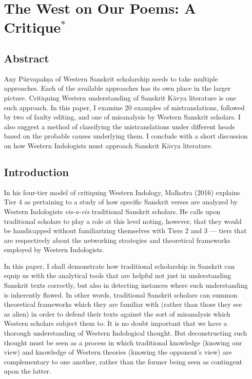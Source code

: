 \chapter[The West on Our Poems: A Critique]{The West on Our Poems: A Critique$^{*}$}\label{chapter\thechapter:begin}


\section*{Abstract} 

Any Pūrvapakṣa of Western Sanskrit scholarship needs to take multiple approaches. Each of the available approaches has its own place in the larger picture. Critiquing Western understanding of Sanskrit Kāvya literature is one such approach. In this paper, I examine 20 examples of mistranslations, followed by two of faulty editing, and one of misanalysis by Western Sanskrit scholars. I also suggest a method of classifying the mistranslations under different heads based on the probable causes underlying them. I conclude with a short discussion on how Western Indologists must approach Sanskrit Kāvya literature. 

\section*{Introduction}  

In his four-tier model of critiquing Western Indology, Malhotra (2016) explains Tier 4 as pertaining to a study of how specific Sanskrit verses are analyzed by Western Indologists \textsl{vis-a-vis} traditional Sanskrit scholars. He calls upon traditional scholars to play a role at this level noting, however, that they would be handicapped without familiarizing themselves with Tiers 2 and 3 --- tiers that are respectively about the networking strategies and theoretical frameworks employed by Western Indologists. 

In this paper, I shall demonstrate how traditional scholarship in Sanskrit can equip us with the analytical tools that are helpful not just in understanding Sanskrit texts correctly, but also in detecting instances where such understanding is inherently flawed. In other words, traditional Sanskrit scholars can summon theoretical frameworks which they are familiar with (rather than those they see as alien) in order to defend their texts against the sort of misanalysis which Western scholars subject them to. It is no doubt important that we have a thorough understanding of Western Indological thought. But deconstructing such thought must be seen as a process in which traditional knowledge (knowing our view) and knowledge of Western theories (knowing the opponent’s view) are complementary to one another, rather than the former being seen as contingent upon the latter. 

